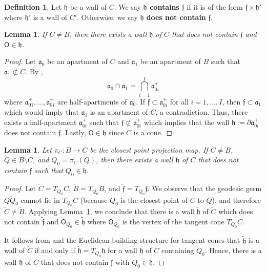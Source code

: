 \documentclass[12pt]{amsart}
\newtheorem{lemma}[theorem]{Lemma}
\theoremstyle{definition}
\newtheorem{definition}[theorem]{Definition}
\numberwithin{equation}{section}
\begin{document}
\begin{definition}
Let $\mathfrak h$ be a wall of $C$.  
We say {\bf  $\mathfrak h$  contains $\mathfrak f$} if it is of the form $\mathfrak f \times \mathfrak h'$ where $\mathfrak h'$ is a wall of $C'$. Otherwise, we say $\mathfrak h$ {\bf does not contain} $\mathfrak f$.
\end{definition}

\begin{lemma} \label{goodwall}
 If $C \neq B$, then there exists a wall $\mathfrak h$ of $C$ that does not contain $\mathfrak f$ and $\mathsf{O} \in \mathfrak h$.  
\end{lemma}


\begin{proof}
Let  $\mathfrak a_0$ be an apartment of $C$ and $\mathfrak a_1$ be an apartment of $B$ such that $\mathfrak a_1 \not \subset C$.  
By \cite[Corollary 4.4.6]{kleiner-leeb}, 
$$\mathfrak a_0 \cap \mathfrak a_1=\bigcap_{i=1}^I \mathfrak a_{0i}^+
$$ 
where $\mathfrak a_{01}^+, \dots, \mathfrak a_{0I}^+$ are half-apartments of $\mathfrak a_0$.  If  $\mathfrak f \subset \mathfrak a_{0i}^+$ for all $i=1, \dots, I$, then $\mathfrak f \subset \mathfrak a_1$ which would imply that $\mathfrak a_1$ is an apartment of $C$, a contradiction.  Thus,  there exists a half-apartment $\mathfrak a_{0i}^+$  such that $\mathfrak f \not \subset \mathfrak a_{0i}^+$ which implies that the wall $\mathfrak h := \partial \mathfrak a_{0i}^+$ does not contain $\mathfrak f$.  Lastly, $\mathsf{O} \in \mathfrak h$ since $C$ is a cone.
\end{proof}

\begin{lemma}\label{betterwall}
Let $\pi_C:B \to C$ be the closest point projection map.
If $C\neq B$, $Q\in B\setminus C$, and $Q_0=\pi_C(Q)$, then there exists a wall $\mathfrak h$ of $C$ that does not contain $\mathfrak f$ such that $Q_0\in\mathfrak h$. 
\end{lemma}
\begin{proof}
Let $\widetilde{C}=T_{Q_0}C$, $\widetilde{B}=T_{Q_0}B$, and $\widetilde{\mathfrak f}=T_{Q_0}\mathfrak f$.  We observe that the geodesic germ $\overline{QQ_0}$ cannot lie in $T_{Q_0}C$ (because $Q_0$ is the closest point of $C$ to $Q$), and therefore $\widetilde{C}\neq\widetilde{B}$.  Applying Lemma~\ref{goodwall}, we conclude that there is a wall $\widetilde{\mathfrak h}$ of $\widetilde{C}$ which does not contain $\widetilde{\mathfrak f}$  and $\mathsf O_{Q_0} \in \widetilde{\mathfrak h}$ where $\mathsf O_{Q_0}$ is the vertex of the tangent cone $T_{Q_0}C$.  

It follows from \cite[Lemma 4.2.3]{kleiner-leeb} and the Euclidean building structure for tangent cones that $\widetilde{\mathfrak h}$ is a wall of $\widetilde C$ if and only if $\widetilde{\mathfrak h}=T_{Q_0}\mathfrak h$ for a wall $\mathfrak h$ of $C$ containing $Q_0$.  Hence, there is a wall $\mathfrak h$ of $C$ that does not contain $\mathfrak f$ with $Q_0 \in \mathfrak h$.
\end{proof}
\end{document}
